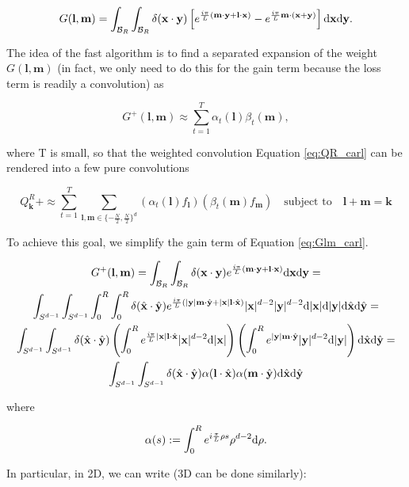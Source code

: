 \documentclass{article}
\def\t{\text}
\def\b{\mathbf}
\begin{document}
\begin{equation} \label{eq:Glm_carl}
    G(\b l, \b m) = \int_{\mathcal{B}_R} \int_{\mathcal{B}_R} \delta(\b x \cdot \b y) \left[  e^{\frac{i \pi}{L} (\b m \cdot \b y + \b l \cdot \b x) } - e^{\frac{i \pi}{L} \b m \cdot (\b x + \b y)} \right] \t d \b x \t d \b y.
\end{equation}

The idea of the fast algorithm is to find a separated expansion of the weight $G(\b l, \b m)$ (in fact, we only need to do this for the gain term because the loss term is readily a convolution) as

\[
    G^+(\b l, \b m) \approx \sum_{t = 1}^T \alpha_t(\b l) \beta_t(\b m),
\]

where T is small, so that the weighted convolution Equation \ref{eq:QR_carl} can be rendered into a few pure convolutions

\[
    Q_{\b k}^R+ \approx \sum_{t=1}^T \sum_{\b l,\b m \in \{-\frac{N}{2}, \frac{N}{2}\}^d} (\alpha_t(\b l) f_{\b l})(\beta_t(\b m) f_{\b m})  \quad \text{subject to} \quad \b l + \b m = \b k
\]

To achieve this goal, we simplify the gain term of Equation \ref{eq:Glm_carl}.

\begin{gather*}
    G^+(\b l, \b m) = \int_{\mathcal{B}_R} \int_{\mathcal{B}_R} \delta(\b x \cdot \b y) e^{\frac{i \pi}{L} (\b m \cdot \b y + \b l \cdot \b x) } \t d \b x \t d \b y = \\
    \int_{S^{d-1}} \int_{S^{d-1}} \int_0^R \int_0^R \delta(\hat{\b x} \cdot \hat{\b y}) e^{\frac{i \pi}{L} (|\b y| \b m \cdot \hat{\b y} + |\b x| \b l \cdot \hat{\b x})} |\b x|^{d-2} |\b y|^{d-2} \t d |\b x| \t d |\b y| \t d \hat{\b x} \t d \hat{\b y} = \\
    \int_{S^{d-1}} \int_{S^{d-1}} \delta(\hat{\b x} \cdot \hat{\b y}) \left( \int_0^R e^{\frac{i \pi}{L} |\b x| \b l \cdot \hat{\b x}} |\b x|^{d-2} \t d |\b x| \right) \left( \int_0^R  e^{|\b y| \b m \cdot \hat{\b y}} |\b y|^{d-2}  \t d |\b y| \right) \t d \hat{\b x} \t d \hat{\b y} = \\
    \int_{S^{d-1}} \int_{S^{d-1}} \delta(\hat{\b x} \cdot \hat{\b y}) \alpha( \b l \cdot \hat{\b x}) \alpha( \b m \cdot \hat{\b y}) \t d \hat{\b x} \t d \hat{\b y}
\end{gather*}

where 

\[
    \alpha(s) := \int_0^R e^{i \frac{\pi}{L} \rho s} \rho^{d-2} \t d \rho.
\]

In particular, in 2D, we can write (3D can be done similarly):
\end{document}
